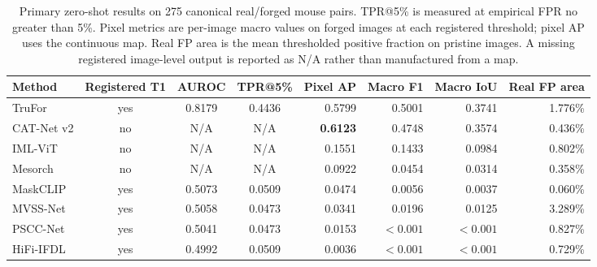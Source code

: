 \begin{table}[t]
\centering
\small
\setlength{\tabcolsep}{4pt}
\begin{tabular}{lcccrrrr}
\toprule
Method & Registered T1 & AUROC & TPR@5\% & Pixel AP & Macro F1 & Macro IoU & Real FP area \\
\midrule
TruFor & yes & 0.8179 & 0.4436 & 0.5799 & 0.5001 & 0.3741 & 1.776\% \\
CAT-Net v2 & no & N/A & N/A & \textbf{0.6123} & 0.4748 & 0.3574 & 0.436\% \\
IML-ViT & no & N/A & N/A & 0.1551 & 0.1433 & 0.0984 & 0.802\% \\
Mesorch & no & N/A & N/A & 0.0922 & 0.0454 & 0.0314 & 0.358\% \\
MaskCLIP & yes & 0.5073 & 0.0509 & 0.0474 & 0.0056 & 0.0037 & 0.060\% \\
MVSS-Net & yes & 0.5058 & 0.0473 & 0.0341 & 0.0196 & 0.0125 & 3.289\% \\
PSCC-Net & yes & 0.5041 & 0.0473 & 0.0153 & $<0.001$ & $<0.001$ & 0.827\% \\
HiFi-IFDL & yes & 0.4992 & 0.0509 & 0.0036 & $<0.001$ & $<0.001$ & 0.729\% \\
\bottomrule
\end{tabular}
\caption{Primary zero-shot results on 275 canonical real/forged mouse pairs. TPR@5\% is measured at empirical FPR no greater than 5\%. Pixel metrics are per-image macro values on forged images at each registered threshold; pixel AP uses the continuous map. Real FP area is the mean thresholded positive fraction on pristine images. A missing registered image-level output is reported as N/A rather than manufactured from a map.}
\label{tab:main-results}
\end{table}
